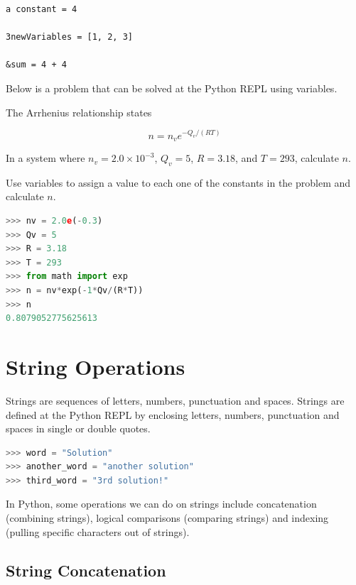\documentclass{book}
\begin{document}
    
        \begin{lstlisting}
a constant = 4

3newVariables = [1, 2, 3]

&sum = 4 + 4
\end{lstlisting}
    




    
        Below is a problem that can be solved at the Python REPL using
variables.

The Arrhenius relationship states

\[ n = n_{v}e^{-Q_v/(RT)} \]

In a system where \(n_v = 2.0 \times 10^{-3}\), \(Q_v = 5\), \(R=3.18\),
and \(T=293\), calculate \(n\).

Use variables to assign a value to each one of the constants in the
problem and calculate \(n\).

\begin{lstlisting}[language=Python]
>>> nv = 2.0e(-0.3)
>>> Qv = 5
>>> R = 3.18
>>> T = 293
>>> from math import exp
>>> n = nv*exp(-1*Qv/(R*T))
>>> n
0.8079052775625613
\end{lstlisting}
    




    
        \section{String Operations}\label{string-operations}
    




    
        Strings are sequences of letters, numbers, punctuation and spaces.
Strings are defined at the Python REPL by enclosing letters, numbers,
punctuation and spaces in single or double quotes.

\begin{lstlisting}[language=Python]
>>> word = "Solution"
>>> another_word = "another solution"
>>> third_word = "3rd solution!"
\end{lstlisting}

In Python, some operations we can do on strings include concatenation
(combining strings), logical comparisons (comparing strings) and
indexing (pulling specific characters out of strings).
    




    
        \subsection{String Concatenation}\label{string-concatenation}
    
\end{document}
